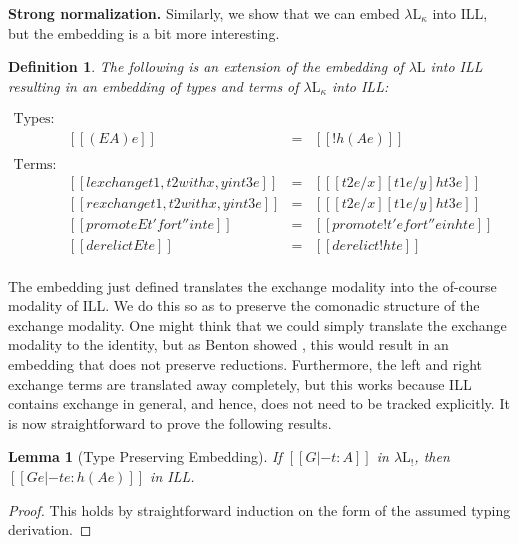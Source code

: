 \documentclass{article}
\newtheorem{lemma}[theorem]{Lemma}
\newtheorem{definition}[theorem]{Definition}
\begin{document}
\textbf{Strong normalization.}  Similarly, we show that we can embed
$\lambda\text{L}_\kappa$ into ILL, but the embedding is a bit more
interesting.

\begin{definition}
  \label{def:embed-lambda-L!-in-ILL}
  The following is an extension of the embedding of $\lambda\text{L}$
  into ILL resulting in an embedding of types and terms of
  $\lambda\text{L}_\kappa$ into ILL:
  \begin{center}
    \begin{math}
      \begin{array}{lrllllllllllllllllll}
        \text{Types:}\\
        & [[(E A) e]] & = & [[! h(A e)]]\\        
        \\
        \text{Terms:}\\
        & [[{lexchange t1 , t2 with x , y in t3} e]] & = & [[ [t2 e/x][t1 e/y]h{t3 e}]]\\
        & [[{rexchange t1 , t2 with x , y in t3} e]] & = & [[ [t2 e/x][t1 e/y]h{t3 e}]]\\
        & [[{promoteE t' for t'' in t} e]] & = & [[promote! t' e for t'' e in h{t e}]]\\
        & [[{derelictE t} e]] & = & [[derelict! h{t e}]]\\
      \end{array}
    \end{math}
  \end{center}
\end{definition}
The embedding just defined translates the exchange modality into the
of-course modality of ILL.  We do this so as to preserve the comonadic
structure of the exchange modality.  One might think that we could
simply translate the exchange modality to the identity, but as Benton
showed \cite{Benton:1995c}, this would result in an embedding that
does not preserve reductions.  Furthermore, the left and right
exchange terms are translated away completely, but this works because
ILL contains exchange in general, and hence, does not need to be
tracked explicitly.  It is now straightforward to prove the following
results.
\begin{lemma}[Type Preserving Embedding]
  \label{lemma:type_preserving_embedding_lambdaLk}
  If $[[G |- t : A]]$ in $\lambda\text{L}_!$, then
  $[[G e |- t e : h(A e)]]$ in ILL.
\end{lemma}
\begin{proof}
  This holds by straightforward induction on the form of the assumed
  typing derivation.
\end{proof}
\end{document}
